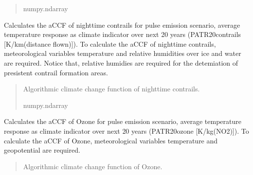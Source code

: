 \documentclass[a4paper,11pt,english]{sphinxmanual}
\begin{document}
\begin{fulllineitems}
\begin{fulllineitems}
\begin{quote}
\begin{description}
\sphinxAtStartPar
numpy.ndarray

\end{description}\end{quote}

\end{fulllineitems}


\begin{fulllineitems}
\label{\detokenize{modules:envlib.accf.GeTaCCFs.accf_ncontrail}}
\pysigstartsignatures
{}
\pysigstopsignatures
\sphinxAtStartPar
Calculates the aCCF of night\sphinxhyphen{}time contrails for pulse emission scenario, average temperature response as
climate indicator over next 20 years (P\sphinxhyphen{}ATR20\sphinxhyphen{}contrails {[}K/km(distance flown){]}). To calculate the aCCF of nighttime contrails,
meteorological variables temperature and relative humidities over ice and water are required. Notice that,
relative humidies are required for the detemiation of presistent contrail formation areas.
\begin{quote}\begin{description}
\sphinxAtStartPar
Algorithmic climate change function of nighttime contrails.

\sphinxAtStartPar
numpy.ndarray

\end{description}\end{quote}

\end{fulllineitems}


\begin{fulllineitems}
\label{\detokenize{modules:envlib.accf.GeTaCCFs.accf_o3}}
\pysigstartsignatures
{}
\pysigstopsignatures
\sphinxAtStartPar
Calculates the aCCF of Ozone for pulse emission scenario, average temperature response as climate
indicator over next 20 years (P\sphinxhyphen{}ATR20\sphinxhyphen{}ozone {[}K/kg(NO2){]}). To calculate the aCCF of Ozone, meteorological variables
temperature and geopotential are required.
\begin{quote}\begin{description}
\sphinxAtStartPar
Algorithmic climate change function of Ozone.


\end{description}
\end{quote}
\end{fulllineitems}
\end{fulllineitems}
\end{document}
